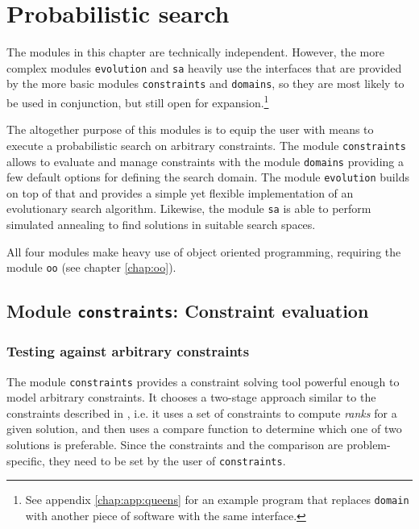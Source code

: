 \chapter{Probabilistic search}

The modules in this chapter are technically independent. However, the more complex modules \texttt{evolution} and \texttt{sa} heavily use the interfaces that are provided by the more basic modules \texttt{constraints} and \texttt{domains}, so they are most likely to be used in conjunction, but still open for expansion.\footnote{See appendix \ref{chap:app:queens} for an example program that replaces \texttt{domain} with another piece of software with the same interface.}

The altogether purpose of this modules is to equip the user with means to execute a probabilistic search on arbitrary constraints. The module \texttt{constraints} allows to evaluate and manage constraints with the module \texttt{domains} providing a few default options for defining the search domain. The module \texttt{evolution} builds on top of that and provides a simple yet flexible implementation of an evolutionary search algorithm. Likewise, the module \texttt{sa} is able to perform simulated annealing to find solutions in suitable search spaces.

All four modules make heavy use of object oriented programming, requiring the module \texttt{oo} (see chapter \ref{chap:oo}).

\section{Module \texttt{constraints}: Constraint evaluation}
\label{sec:evolution:constraints}

\subsection{Testing against arbitrary constraints}

The module \texttt{constraints} provides a constraint solving tool powerful enough to model arbitrary constraints. It chooses a two-stage approach similar to the constraints described in \cite{HoelzlMeierWirsing2009}, i.e. it uses a set of constraints to compute \emph{ranks} for a given solution, and then uses a compare function to determine which one of two solutions is preferable. Since the constraints and the comparison are problem-specific, they need to be set by the user of \texttt{constraints}.

